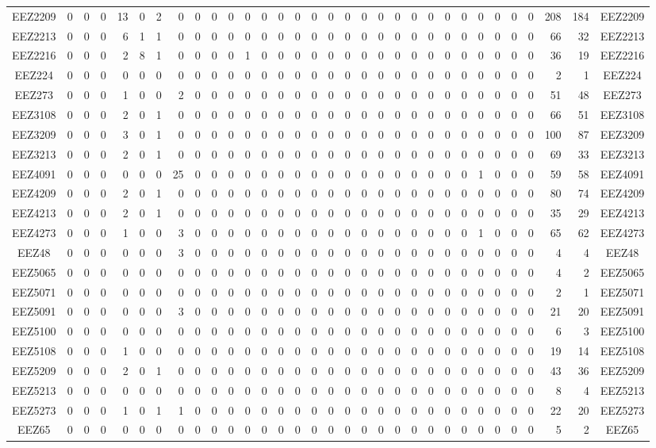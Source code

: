\documentclass[10pt,a4paper,twoside]{report}
\begin{document}
{\begin{tabular}{crrrrrrrrrrrrrrrrrrrrrrrrrrrrrrc}
EEZ2209&0&0&0&13&0&2&0&0&0&0&0&0&0&0&0&0&0&0&0&0&0&0&0&0&0&0&0&0&208&184&EEZ2209\\
EEZ2213&0&0&0&6&1&1&0&0&0&0&0&0&0&0&0&0&0&0&0&0&0&0&0&0&0&0&0&0&66&32&EEZ2213\\
EEZ2216&0&0&0&2&8&1&0&0&0&0&1&0&0&0&0&0&0&0&0&0&0&0&0&0&0&0&0&0&36&19&EEZ2216\\
EEZ224&0&0&0&0&0&0&0&0&0&0&0&0&0&0&0&0&0&0&0&0&0&0&0&0&0&0&0&0&2&1&EEZ224\\
EEZ273&0&0&0&1&0&0&2&0&0&0&0&0&0&0&0&0&0&0&0&0&0&0&0&0&0&0&0&0&51&48&EEZ273\\
EEZ3108&0&0&0&2&0&1&0&0&0&0&0&0&0&0&0&0&0&0&0&0&0&0&0&0&0&0&0&0&66&51&EEZ3108\\
EEZ3209&0&0&0&3&0&1&0&0&0&0&0&0&0&0&0&0&0&0&0&0&0&0&0&0&0&0&0&0&100&87&EEZ3209\\
EEZ3213&0&0&0&2&0&1&0&0&0&0&0&0&0&0&0&0&0&0&0&0&0&0&0&0&0&0&0&0&69&33&EEZ3213\\
EEZ4091&0&0&0&0&0&0&25&0&0&0&0&0&0&0&0&0&0&0&0&0&0&0&0&0&1&0&0&0&59&58&EEZ4091\\
EEZ4209&0&0&0&2&0&1&0&0&0&0&0&0&0&0&0&0&0&0&0&0&0&0&0&0&0&0&0&0&80&74&EEZ4209\\
EEZ4213&0&0&0&2&0&1&0&0&0&0&0&0&0&0&0&0&0&0&0&0&0&0&0&0&0&0&0&0&35&29&EEZ4213\\
EEZ4273&0&0&0&1&0&0&3&0&0&0&0&0&0&0&0&0&0&0&0&0&0&0&0&0&1&0&0&0&65&62&EEZ4273\\
EEZ48&0&0&0&0&0&0&3&0&0&0&0&0&0&0&0&0&0&0&0&0&0&0&0&0&0&0&0&0&4&4&EEZ48\\
EEZ5065&0&0&0&0&0&0&0&0&0&0&0&0&0&0&0&0&0&0&0&0&0&0&0&0&0&0&0&0&4&2&EEZ5065\\
EEZ5071&0&0&0&0&0&0&0&0&0&0&0&0&0&0&0&0&0&0&0&0&0&0&0&0&0&0&0&0&2&1&EEZ5071\\
EEZ5091&0&0&0&0&0&0&3&0&0&0&0&0&0&0&0&0&0&0&0&0&0&0&0&0&0&0&0&0&21&20&EEZ5091\\
EEZ5100&0&0&0&0&0&0&0&0&0&0&0&0&0&0&0&0&0&0&0&0&0&0&0&0&0&0&0&0&6&3&EEZ5100\\
EEZ5108&0&0&0&1&0&0&0&0&0&0&0&0&0&0&0&0&0&0&0&0&0&0&0&0&0&0&0&0&19&14&EEZ5108\\
EEZ5209&0&0&0&2&0&1&0&0&0&0&0&0&0&0&0&0&0&0&0&0&0&0&0&0&0&0&0&0&43&36&EEZ5209\\
EEZ5213&0&0&0&0&0&0&0&0&0&0&0&0&0&0&0&0&0&0&0&0&0&0&0&0&0&0&0&0&8&4&EEZ5213\\
EEZ5273&0&0&0&1&0&1&1&0&0&0&0&0&0&0&0&0&0&0&0&0&0&0&0&0&0&0&0&0&22&20&EEZ5273\\
EEZ65&0&0&0&0&0&0&0&0&0&0&0&0&0&0&0&0&0&0&0&0&0&0&0&0&0&0&0&0&5&2&EEZ65\\

\end{tabular}}
\end{document}
